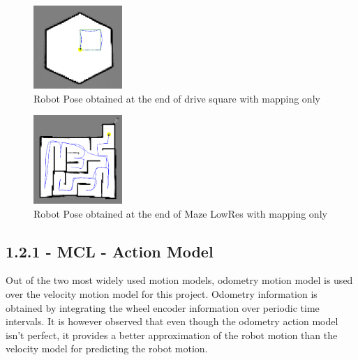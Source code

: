 \documentclass[journal,onecolumn]{IEEEtran}
\begin{document}
\begin{figure}[H]
\centering
\includegraphics[width=0.3\textwidth]{Media/112.png}
\caption{Robot Pose obtained at the end of drive square with mapping only}
\end{figure}

\begin{figure}[H]
\centering
\includegraphics[width=0.3\textwidth]{Media/113.png}
\caption{Robot Pose obtained at the end of Maze LowRes with mapping only}
\end{figure}

\subsection*{1.2.1 - MCL - Action Model} 

Out of the two most widely used motion models, odometry motion model is used over the velocity motion model for this project. Odometry information is obtained by integrating the wheel encoder information over periodic time intervals. It is however observed that even though the odometry action model isn't perfect, it provides a better approximation of the robot motion than the velocity model for predicting the robot motion.
\end{document}
